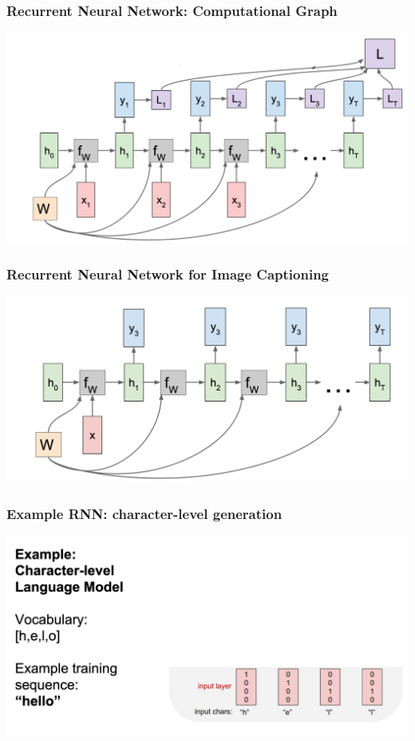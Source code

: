 \documentclass[aspectratio=1610]{beamer} %
\begin{document}
\begin{frame}

\frametitle{Recurrent Neural Network: Computational Graph}

\begin{center}
\includegraphics[width=.9\textwidth]{pics/rnngraph7}
\end{center}

\end{frame}

\begin{frame}

\frametitle{Recurrent Neural Network for Image Captioning}

\begin{center}
\includegraphics[width=.9\textwidth]{pics/rnngraph8}
\end{center}

\end{frame}


\begin{frame}

\frametitle{Example RNN: character-level generation}

\begin{center}
\includegraphics[width=\textwidth]{pics/example1}
\end{center}

\end{frame}
\end{document}
